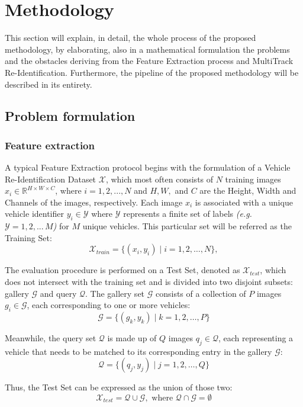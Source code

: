 \chapter{Methodology}
\label{chap:Methodology}

This section will explain, in detail, the whole process of the proposed methodology, by elaborating, also in a mathematical formulation the problems and the obstacles deriving from the Feature Extraction process and MultiTrack Re-Identification. Furthermore, the pipeline of the proposed methodology will be described in its entirety.

\section{Problem formulation}

\subsection{Feature extraction}
A typical Feature Extraction protocol begins with the formulation of a Vehicle Re-Identification Dataset $\mathcal{X}$, which most often consists of $N$ training images $x_{i} \in \mathbb{R}^{H \times W \times C}$, where $i = 1, 2, ..., N$ and $H, W,$ and $C$ are the Height, Width and Channels of the images, respectively. Each image $x_{i}$ is associated with a unique vehicle identifier $y_{i} \in \mathcal{Y}$ where $\mathcal{Y}$ represents a finite set of labels \textit{(e.g. $\mathcal{Y} = {1, 2, ... \, M}$)} for $M$ unique vehicles. This particular set will be referred as the Training Set:
\[
    \mathcal{X}_{train} = \{(x_i, y_i) \mid i = 1, 2, \ldots, N\},
\]

The evaluation procedure is performed on a Test Set, denoted as $\mathcal{X}_{test}$, which does not intersect with the training set and is divided into two disjoint subsets: gallery $\mathcal{G}$ and query $\mathcal{Q}$. The gallery set $\mathcal{G}$ consists of a collection of $P$ images $g_{i} \in \mathcal{G}$, each corresponding to one or more vehicles:
\[
    \mathcal{G} = \{(g_k, y_k) \mid k = 1, 2, \ldots, P\}
\]

Meanwhile, the query set $\mathcal{Q}$ is made up of $Q$ images $q_{j} \in \mathcal{Q}$, each representing a vehicle that needs to be matched to its corresponding entry in the gallery $\mathcal{G}$:
\[
    \mathcal{Q} = \{(q_j, y_j) \mid j = 1, 2, \ldots, Q\}
\]

Thus, the Test Set can be expressed as the union of those two:
\[
    \mathcal{X}_{test} = \mathcal{Q} \cup \mathcal{G}, \text{ where } \mathcal{Q} \cap \mathcal{G} = \emptyset
\]

